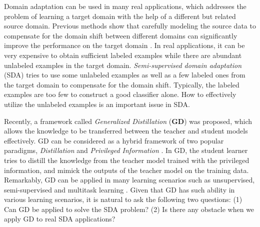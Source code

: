 
Domain adaptation can be used in many real applications, which addresses the problem of learning a target domain with the help of a different but related source domain. Previous methods show that carefully modeling the source data to compensate for the domain shift between different domains can significantly improve the performance on the target domain \cite{Donahue_2013_CVPR}. In real applications, it can be very expensive to obtain sufficient labeled examples while there are abundant unlabeled examples in the target domain. 
\textit{Semi-supervised domain adaptation} (SDA) tries to use some unlabeled examples as well as a few labeled ones from the target domain to compensate for the domain shift\cite{karl2001long}. Typically, the labeled examples are too few to construct a good classifier alone. How to effectively utilize the unlabeled examples is an important issue in SDA. 

Recently, a framework called \textit{Generalized Distillation} (\textbf{GD}) \cite{lopez2015unifying} was proposed, which allows the knowledge to be transferred between the teacher and student models effectively. GD can be considered as a hybrid framework of two popular paradigms, \textit{Distillation} \cite{hinton2015distilling} and \textit{Privileged Information} \cite{vapnik2015learning}. In GD, the student learner tries to distill the knowledge from the teacher model trained with the privileged information, and mimick the outputs of the teacher model on the training data. Remarkably, GD can be applied in many learning scenarios such as unsupervised, semi-supervised and multitask learning \cite{lopez2015unifying}. Given that GD has such ability in various learning scenarios, it is natural to ask the following two questions: (1) Can GD be applied to solve the SDA problem? (2) Is there any obstacle when we apply GD to real SDA applications?

